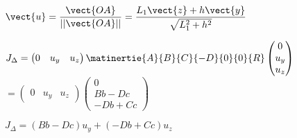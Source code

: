 \ifprof \begin{corrige}
$\vect{u}=\dfrac{\vect{OA}}{||\vect{OA}||}=\dfrac{L_1\vect{z}+h\vect{y}}{\sqrt{L_1^2+h^2}}$

$J_{\Delta}=\begin{pmatrix} 0 & u_y &  u_z \end{pmatrix} \matinertie{A}{B}{C}{-D}{0}{0}{R}
\begin{pmatrix} 0 \\ u_y \\  u_z \end{pmatrix}$
$=\begin{pmatrix} 0 & u_y &  u_z \end{pmatrix} 
\begin{pmatrix} 0 \\ Bb-Dc \\  -Db +Cc \end{pmatrix}$

$J_{\Delta}= \left( Bb-Dc\right)u_y + \left( -Db +Cc\right)u_z$

\end{corrige}
\else\fi




%
%
%
%
%
%
%


%